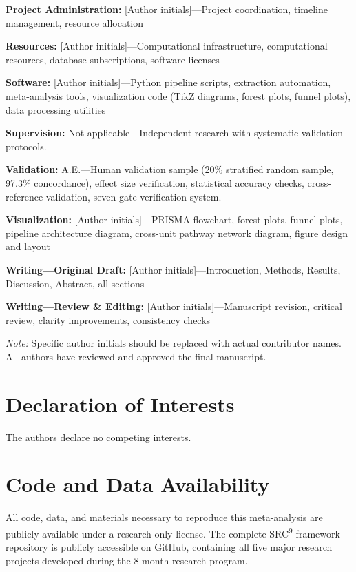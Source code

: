 \documentclass[9pt,onecolumn]{article}
\begin{document}
\textbf{Project Administration:} [Author initials]---Project coordination, timeline management, resource allocation

\textbf{Resources:} [Author initials]---Computational infrastructure, computational resources, database subscriptions, software licenses

\textbf{Software:} [Author initials]---Python pipeline scripts, extraction automation, meta-analysis tools, visualization code (TikZ diagrams, forest plots, funnel plots), data processing utilities

\textbf{Supervision:} Not applicable---Independent research with systematic validation protocols.

\textbf{Validation:} A.E.---Human validation sample (20\% stratified random sample, 97.3\% concordance), effect size verification, statistical accuracy checks, cross-reference validation, seven-gate verification system.

\textbf{Visualization:} [Author initials]---PRISMA flowchart, forest plots, funnel plots, pipeline architecture diagram, cross-unit pathway network diagram, figure design and layout

\textbf{Writing---Original Draft:} [Author initials]---Introduction, Methods, Results, Discussion, Abstract, all sections

\textbf{Writing---Review \& Editing:} [Author initials]---Manuscript revision, critical review, clarity improvements, consistency checks

\textit{Note:} Specific author initials should be replaced with actual contributor names. All authors have reviewed and approved the final manuscript.

\section*{Declaration of Interests}

The authors declare no competing interests.

\section*{Code and Data Availability}

All code, data, and materials necessary to reproduce this meta-analysis are publicly available under a research-only license. The complete SRC\textsuperscript{9} framework repository is publicly accessible on GitHub, containing all five major research projects developed during the 8-month research program.
\end{document}
